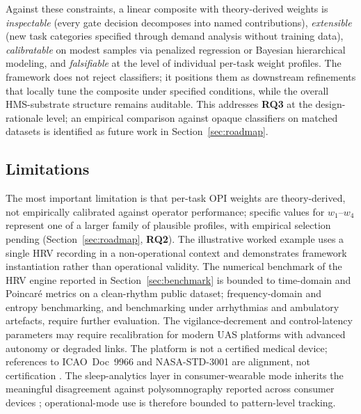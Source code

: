 \documentclass[10pt,journal,twocolumn,compsoc]{IEEEtran}
\begin{document}
Against these constraints, a linear composite with theory-derived weights is \textit{inspectable} (every gate decision decomposes into named contributions), \textit{extensible} (new task categories specified through demand analysis without training data), \textit{calibratable} on modest samples via penalized regression or Bayesian hierarchical modeling, and \textit{falsifiable} at the level of individual per-task weight profiles. The framework does not reject classifiers; it positions them as downstream refinements that locally tune the composite under specified conditions, while the overall HMS-substrate structure remains auditable. This addresses \textbf{RQ3} at the design-rationale level; an empirical comparison against opaque classifiers on matched datasets is identified as future work in Section~\ref{sec:roadmap}.

\subsection{Limitations}
The most important limitation is that per-task OPI weights are theory-derived, not empirically calibrated against operator performance; specific values for $w_1$--$w_4$ represent one of a larger family of plausible profiles, with empirical selection pending (Section~\ref{sec:roadmap}, \textbf{RQ2}). The illustrative worked example uses a single HRV recording in a non-operational context and demonstrates framework instantiation rather than operational validity. The numerical benchmark of the HRV engine reported in Section~\ref{sec:benchmark} is bounded to time-domain and Poincar\'e metrics on a clean-rhythm public dataset; frequency-domain and entropy benchmarking, and benchmarking under arrhythmias and ambulatory artefacts, require further evaluation. The vigilance-decrement and control-latency parameters \cite{warm2008,chen2007} may require recalibration for modern UAS platforms with advanced autonomy or degraded links. The platform is not a certified medical device; references to ICAO~Doc~9966 and NASA-STD-3001 are alignment, not certification \cite{icao2020,nasa2023}. The sleep-analytics layer in consumer-wearable mode inherits the meaningful disagreement against polysomnography reported across consumer devices \cite{lee2025,schyvens2024}; operational-mode use is therefore bounded to pattern-level tracking.
\end{document}
